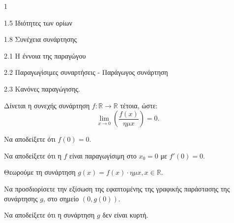 \begin{ylh}{1}
    \item 1.5 Ιδιότητες των ορίων
    \item 1.8 Συνέχεια συνάρτησης
    \item 2.1 Η έννοια της παραγώγου
    \item 2.2 Παραγωγίσιμες συναρτήσεις - Παράγωγος συνάρτηση
    \item 2.3 Κανόνες παραγώγισης.
\end{ylh}
Δίνεται η συνεχής συνάρτηση $f: \mathbb{R} \to \mathbb{R}$ τέτοια, ώστε:
\[
\lim_{x \to 0} \left( \frac{f(x)}{\eta \mu x} \right) = 0.
\]
\begin{alist}
\item Να αποδείξετε ότι $f(0)=0$. 
\item Να αποδείξετε ότι η $f$ είναι παραγωγίσιμη στο $x_0 = 0$ με $f'(0)=0$. 
\item Θεωρούμε τη συνάρτηση $g(x) = f(x) \cdot \eta \mu x, x \in \mathbb{R}$.
    \begin{rlist}
    \item Να προσδιορίσετε την εξίσωση της εφαπτομένης της γραφικής παράστασης της συνάρτησης $g$, στο σημείο $(0,g(0))$. 
    \item Να αποδείξετε ότι η συνάρτηση $g$ δεν είναι κυρτή. 
    \end{rlist}
\end{alist}